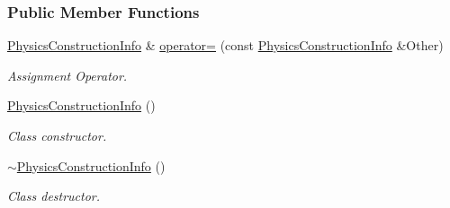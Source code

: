 \subsubsection*{Public Member Functions}
\begin{DoxyCompactItemize}
\item 
\hyperlink{classphys_1_1PhysicsConstructionInfo}{PhysicsConstructionInfo} \& \hyperlink{classphys_1_1PhysicsConstructionInfo_a69aff9644621d3a76c6901bb94c2a33d}{operator=} (const \hyperlink{classphys_1_1PhysicsConstructionInfo}{PhysicsConstructionInfo} \&Other)
\begin{DoxyCompactList}\small\item\em Assignment Operator. \item\end{DoxyCompactList}\item 
\hypertarget{classphys_1_1PhysicsConstructionInfo_a4ac8eccf1d73e949fdf753509a784c91}{
\hyperlink{classphys_1_1PhysicsConstructionInfo_a4ac8eccf1d73e949fdf753509a784c91}{PhysicsConstructionInfo} ()}
\label{classphys_1_1PhysicsConstructionInfo_a4ac8eccf1d73e949fdf753509a784c91}

\begin{DoxyCompactList}\small\item\em Class constructor. \item\end{DoxyCompactList}\item 
\hypertarget{classphys_1_1PhysicsConstructionInfo_ae795723590da96922fefbdf507381ba5}{
\hyperlink{classphys_1_1PhysicsConstructionInfo_ae795723590da96922fefbdf507381ba5}{$\sim$PhysicsConstructionInfo} ()}
\label{classphys_1_1PhysicsConstructionInfo_ae795723590da96922fefbdf507381ba5}

\begin{DoxyCompactList}\small\item\em Class destructor. \item\end{DoxyCompactList}\end{DoxyCompactItemize}
